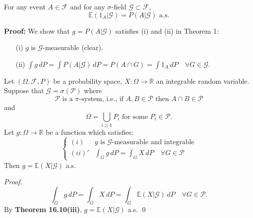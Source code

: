\begin{example}
    
For any event \( A \in \mathcal{F} \) and for any \(\sigma\)-field \( \mathcal{G} \subset \mathcal{F} \),
\[ \mathbb{E}(1_A | \mathcal{G}) = P(A | \mathcal{G}) \text{ a.s.} \]

\textbf{Proof:}
We show that \( g = P(A|\mathcal{G}) \) satisfies (i) and (ii) in Theorem 1:
\begin{itemize}
    \item[(i)] \( g \) is \( \mathcal{G} \)-measurable (clear).
    \item[(ii)] \(\int g \, dP = \int P(A | \mathcal{G}) \, dP = P(A \cap G) = \int 1_A \, dP \quad \forall G \in \mathcal{G}.\)
\end{itemize}
\end{example}

\begin{theorem}
Let \((\Omega, \mathcal{F}, P)\) be a probability space, \(X: \Omega \rightarrow \mathbb{R}\) an integrable random variable. Suppose that \(\mathcal{G} = \sigma(\mathcal{P})\) where
\[
\mathcal{P} \text{ is a } \pi\text{-system, i.e., if } A, B \in \mathcal{P} \text{ then } A \cap B \in \mathcal{P}
\]
and
\[
\Omega = \bigcup_{i \geq 1} P_i \text{ for some } P_i \in \mathcal{P}.
\]
Let \(g: \Omega \rightarrow \mathbb{R}\) be a function which satisfies:
\[
\begin{cases}
(i) & g \text{ is } \mathcal{G}\text{-measurable and integrable} \\
(ii)' & \int_G g \, dP = \int_G X \, dP \quad \forall G \in \mathcal{P}
\end{cases}
\]
Then \(g = \mathbb{E}(X|\mathcal{G})\) a.s.
\end{theorem}
\begin{proof}
\[
\int_G g \, dP = \int_G X \, dP = \int_G \mathbb{E}(X|\mathcal{G}) \, dP \quad \forall G \in \mathcal{P}.
\]
By \textbf{Theorem 16.10(iii)}, \(g = \mathbb{E}(X|\mathcal{G})\) a.s. \qed
\end{proof}

